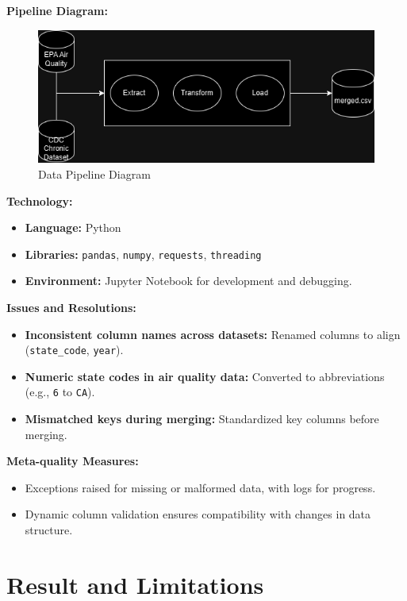 \documentclass[a4paper,12pt]{article}
\begin{document}
\textbf{Pipeline Diagram:}
\begin{figure}[h!]
    \centering
    \includegraphics[width=\textwidth]{pipeline.png}
    \caption{Data Pipeline Diagram}
    \label{fig:pipeline}
\end{figure}

\textbf{Technology:}
\begin{itemize}
    \item \textbf{Language:} Python
    \item \textbf{Libraries:} \texttt{pandas}, \texttt{numpy}, \texttt{requests}, \texttt{threading}
    \item \textbf{Environment:} Jupyter Notebook for development and debugging.
\end{itemize}

\textbf{Issues and Resolutions:}
\begin{itemize}
    \item \textbf{Inconsistent column names across datasets:} Renamed columns to align (\texttt{state\_code}, \texttt{year}).
    \item \textbf{Numeric state codes in air quality data:} Converted to abbreviations (e.g., \texttt{6} to \texttt{CA}).
    \item \textbf{Mismatched keys during merging:} Standardized key columns before merging.
\end{itemize}

\textbf{Meta-quality Measures:}
\begin{itemize}
    \item Exceptions raised for missing or malformed data, with logs for progress.
    \item Dynamic column validation ensures compatibility with changes in data structure.
\end{itemize}

\section*{Result and Limitations}
\end{document}
